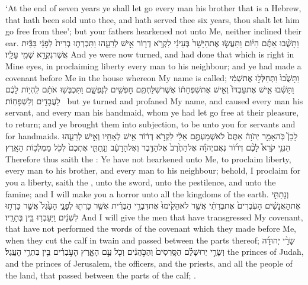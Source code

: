 {‘At the end of seven years ye shall let go every man his brother that is a Hebrew, that hath been sold unto thee, and hath served thee six years, thou shalt let him go free from thee’; but your fathers hearkened not unto Me, neither inclined their ear.}
{וַתָּשֻׁ֨בוּ אַתֶּ֜ם הַיּ֗וֹם וַתַּעֲשׂ֤וּ אֶת\maqqaf הַיָּשָׁר֙ בְּעֵינַ֔י לִקְרֹ֥א דְר֖וֹר אִ֣ישׁ לְרֵעֵ֑הוּ וַתִּכְרְת֤וּ בְרִית֙ לְפָנַ֔י בַּבַּ֕יִת אֲשֶׁר\maqqaf נִקְרָ֥א שְׁמִ֖י עָלָֽיו׃}
{And ye were now turned, and had done that which is right in Mine eyes, in proclaiming liberty every man to his neighbour; and ye had made a covenant before Me in the house whereon My name is called;}
{וַתָּשֻׁ֙בוּ֙ וַתְּחַלְּל֣וּ אֶת\maqqaf שְׁמִ֔י וַתָּשִׁ֗בוּ אִ֤ישׁ אֶת\maqqaf עַבְדּוֹ֙ וְאִ֣ישׁ אֶת\maqqaf שִׁפְחָת֔וֹ אֲשֶׁר\maqqaf שִׁלַּחְתֶּ֥ם חׇפְשִׁ֖ים לְנַפְשָׁ֑ם וַתִּכְבְּשׁ֣וּ אֹתָ֔ם לִֽהְי֣וֹת לָכֶ֔ם לַעֲבָדִ֖ים וְלִשְׁפָחֽוֹת׃ \setuma }
{but ye turned and profaned My name, and caused every man his servant, and every man his handmaid, whom ye had let go free at their pleasure, to return; and ye brought them into subjection, to be unto you for servants and for handmaids.}
{לָכֵן֮ כֹּֽה\maqqaf אָמַ֣ר יְהֹוָה֒ אַתֶּם֙ לֹא\maqqaf שְׁמַעְתֶּ֣ם אֵלַ֔י לִקְרֹ֣א דְר֔וֹר אִ֥ישׁ לְאָחִ֖יו וְאִ֣ישׁ לְרֵעֵ֑הוּ הִנְנִ֣י קֹרֵא֩ לָכֶ֨ם דְּר֜וֹר נְאֻם\maqqaf יְהֹוָ֗ה אֶל\maqqaf הַחֶ֙רֶב֙ אֶל\maqqaf הַדֶּ֣בֶר וְאֶל\maqqaf הָרָעָ֔ב וְנָֽתַתִּ֤י אֶתְכֶם֙  לְכֹ֖ל מַמְלְכ֥וֹת הָאָֽרֶץ׃}
{Therefore thus saith the \lord: Ye have not hearkened unto Me, to proclaim liberty, every man to his brother, and every man to his neighbour; behold, I proclaim for you a liberty, saith the \lord, unto the sword, unto the pestilence, and unto the famine; and I will make you a horror unto all the kingdoms of the earth.}
{וְנָתַתִּ֣י אֶת\maqqaf הָאֲנָשִׁ֗ים הָעֹֽבְרִים֙ אֶת\maqqaf בְּרִתִ֔י אֲשֶׁ֤ר לֹא\maqqaf הֵקִ֙ימוּ֙ אֶת\maqqaf דִּבְרֵ֣י הַבְּרִ֔ית אֲשֶׁ֥ר כָּרְת֖וּ לְפָנָ֑י הָעֵ֙גֶל֙ אֲשֶׁ֣ר כָּרְת֣וּ לִשְׁנַ֔יִם וַיַּעַבְר֖וּ בֵּ֥ין בְּתָרָֽיו׃}
{And I will give the men that have transgressed My covenant, that have not performed the words of the covenant which they made before Me, when they cut the calf in twain and passed between the parts thereof;}
{שָׂרֵ֨י יְהוּדָ֜ה וְשָׂרֵ֣י יְרוּשָׁלַ֗͏ִם הַסָּֽרִסִים֙ וְהַכֹּ֣הֲנִ֔ים וְכֹ֖ל עַ֣ם הָאָ֑רֶץ הָעֹ֣בְרִ֔ים בֵּ֖ין בִּתְרֵ֥י הָעֵֽגֶל׃}
{the princes of Judah, and the princes of Jerusalem, the officers, and the priests, and all the people of the land, that passed between the parts of the calf; .}
